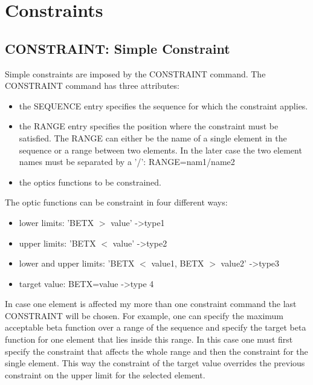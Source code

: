 \section{Constraints}

\subsection{CONSTRAINT: Simple Constraint}
\label{subsec:match_con}

Simple constraints are imposed by the CONSTRAINT command. The CONSTRAINT
command has three attributes:   
\begin{itemize}
	\item  the SEQUENCE entry specifies the sequence for which the
          constraint applies.  
	\item  the RANGE entry specifies the position where the
          constraint must be satisfied. The RANGE can either be the name
          of a single element in the sequence or a range between two
          elements. In the later case the two element names must be
          separated by a '/': RANGE=nam1/name2  
	\item the optics functions to be constrained. 
\end{itemize} 

The optic functions can be constraint in four different ways: 
\begin{itemize}
	\item lower limits: 'BETX $>$ value' -\textgreater type1 
	\item upper limits: 'BETX $<$ value' -\textgreater type2 
	\item lower and upper limits: 'BETX $<$ value1, 
          BETX $>$ value2' -\textgreater type3  
	\item target value: BETX=value -\textgreater type 4 
\end{itemize} 

In case one element is affected my more than one constraint command the
last  CONSTRAINT will be chosen. For example, one can specify the
maximum acceptable beta function over a range of the sequence and
specify the target beta  function for one element that lies inside this
range. In this case one must first specify the constraint that affects
the whole range and then the constraint for the single element. This way
the constraint of the target value overrides the previous constraint on
the upper limit for the selected element. 

